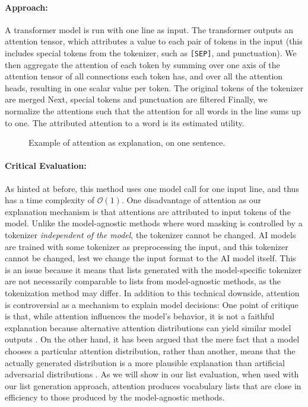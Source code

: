 \paragraph{Approach:}
A transformer model is run with one line as input.
The transformer outputs an attention tensor, which attributes a value to each pair of tokens in the input (this includes special tokens from the tokenizer, such as \texttt{[SEP]}, and punctuation).
We then aggregate the attention of each token by summing over one axis of the attention tensor of all connections each token has, and over all the attention heads, resulting in one scalar value per token.
The original tokens of the tokenizer are merged
Next, special tokens and punctuation are filtered
Finally, we normalize the attentions such that the attention for all words in the line sums up to one.
The attributed attention to a word is its estimated utility.

\begin{figure}[H]
	
	\caption{Example of attention as explanation, on one sentence.}
	\label{fig:attention}
\end{figure}

\paragraph{Critical Evaluation:}
As hinted at before, this method uses one model call for one input line, and thus has a time complexity of $\mathcal{O}(1)$.
One disadvantage of attention as our explanation mechanism is that attentions are attributed to input tokens of the model.
Unlike the model-agnostic methods where word masking is controlled by a tokenizer \textit{independent of the model}, the tokenizer cannot be changed.
AI models are trained with some tokenizer as preprocessing the input, and this tokenizer cannot be changed, lest we change the input format to the AI model itself.
This is an issue because it means that lists generated with the model-specific tokenizer are not necessarily comparable to lists from model-agnostic methods, as the tokenization method may differ.
In addition to this technical downside, attention is controversial as a mechanism to explain model decisions:
One point of critique is that, while attention influences the model's behavior, it is not a faithful explanation because alternative attention distributions can yield similar model outputs \cite{jainAttentionNotExplanation2019}.
On the other hand, it has been argued that the mere fact that a model chooses a particular attention distribution, rather than another, means that the actually generated distribution is a more plausible explanation than artificial adversarial distributions \cite{wiegreffeAttentionNotNot2019}.
As we will show in our list evaluation, when used with our list generation approach, attention produces vocabulary lists that are close in efficiency to those produced by the model-agnostic methods.

